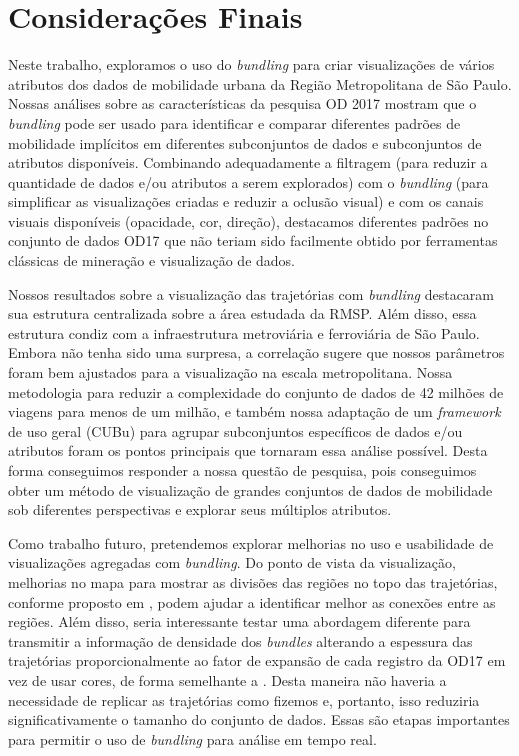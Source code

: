 \chapter{Considerações Finais}
\label{cap:plano-de-trabalho}

Neste trabalho, exploramos o uso do \emph{bundling} para criar
visualizações de vários atributos dos dados de mobilidade urbana da Região
Metropolitana de São Paulo. Nossas análises sobre as características da pesquisa
OD 2017 mostram que o \emph{bundling} pode ser usado para identificar e comparar
diferentes padrões de mobilidade implícitos em diferentes subconjuntos de dados
e subconjuntos de atributos disponíveis. Combinando adequadamente a filtragem
(para reduzir a quantidade de dados e/ou atributos a serem explorados) com o
\emph{bundling} (para simplificar as visualizações criadas e reduzir a oclusão
visual) e com os canais visuais disponíveis (opacidade, cor, direção),
destacamos diferentes padrões no conjunto de dados OD17 que não teriam sido
facilmente obtido por ferramentas clássicas de mineração e visualização de
dados.

Nossos resultados sobre a visualização das trajetórias com \emph{bundling}
destacaram sua estrutura centralizada sobre a área estudada da RMSP. Além disso,
essa estrutura condiz com a infraestrutura metroviária e ferroviária de São
Paulo. Embora não tenha sido uma surpresa, a correlação sugere que nossos
parâmetros foram bem ajustados para a visualização na escala metropolitana.
Nossa metodologia para reduzir a complexidade do conjunto de dados de 42 milhões
de viagens para menos de um milhão, e também nossa adaptação de um
\emph{framework} de uso geral (CUBu) para agrupar subconjuntos específicos de
dados e/ou atributos foram os pontos principais que tornaram essa análise
possível. Desta forma conseguimos responder a nossa questão de pesquisa, pois
conseguimos obter um método de visualização de grandes conjuntos de dados de
mobilidade sob diferentes perspectivas e explorar seus múltiplos atributos.

Como trabalho futuro, pretendemos explorar melhorias no uso e usabilidade de
visualizações agregadas com \emph{bundling}. Do ponto de vista da visualização,
melhorias no mapa para mostrar as divisões das regiões no topo das trajetórias,
conforme proposto em \citet{Klein2014}, podem ajudar a identificar melhor as
conexões entre as regiões. Além disso, seria interessante testar uma abordagem
diferente para transmitir a informação de densidade dos \emph{bundles} alterando
a espessura das trajetórias proporcionalmente ao fator de expansão de cada
registro da OD17 em vez de usar cores, de forma semelhante a
\citet{lhuillier-fft:17}. Desta maneira não haveria a necessidade de replicar as
trajetórias como fizemos e, portanto, isso reduziria significativamente o
tamanho do conjunto de dados. Essas são etapas importantes para permitir o uso
de \emph{bundling} para análise em tempo real.

